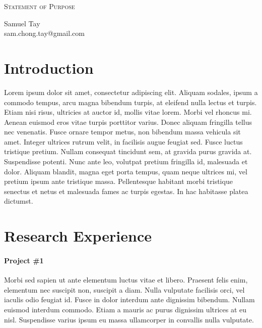 \documentclass[letterpaper]{article}
\makeatletter
\newcommand{\soptitle}{Statement of Purpose}
\newcommand{\yourname}{Samuel Tay}
\newcommand{\youremail}{sam.chong.tay@gmail.com}
\newcommand{\amper}{{\fontspec[Scale=.95]{Adobe Caslon Pro}\selectfont\itshape\&~{}}}
\makeatother
\begin{document}
\begin{center}{\huge \scshape \soptitle}\end{center}
\begin{center}\vspace{0.2em} {\Large \yourname\\}
  {\youremail}\end{center}

\section*{Introduction}
Lorem ipsum dolor sit amet, consectetur adipiscing elit. Aliquam
sodales, ipsum a commodo tempus, arcu magna bibendum turpis, at
eleifend nulla lectus et turpis. Etiam nisi risus, ultricies at auctor
id, mollis vitae lorem. Morbi vel rhoncus mi. Aenean euismod eros
vitae turpis porttitor varius. Donec aliquam fringilla tellus nec
venenatis. Fusce ornare tempor metus, non bibendum massa vehicula sit
amet. Integer ultrices rutrum velit, in facilisis augue feugiat sed.
Fusce luctus tristique pretium. Nullam consequat tincidunt sem, at
gravida purus gravida at. Suspendisse potenti. Nunc ante leo, volutpat
pretium fringilla id, malesuada et dolor. Aliquam blandit, magna eget
porta tempus, quam neque ultrices mi, vel pretium ipsum ante tristique
massa. Pellentesque habitant morbi tristique senectus et netus et
malesuada fames ac turpis egestas. In hac habitasse platea dictumst.

\section*{Research Experience}
\paragraph{Project \#1}
Morbi sed sapien ut ante elementum luctus vitae et libero. Praesent
felis enim, elementum nec suscipit non, suscipit a diam. Nulla
vulputate facilisis orci, vel iaculis odio feugiat id. Fusce in dolor
interdum ante dignissim bibendum. Nullam euismod interdum commodo.
Etiam a mauris ac purus dignissim ultrices at eu nisl. Suspendisse
varius ipsum eu massa ullamcorper in convallis nulla vulputate.
\end{document}
